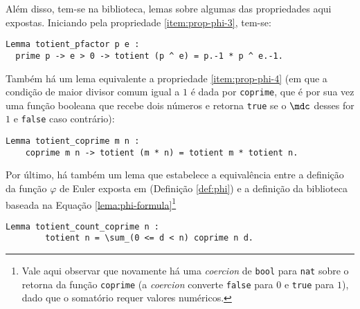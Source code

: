 Além disso, tem-se na biblioteca, lemas sobre algumas das propriedades aqui expostas. Iniciando pela propriedade \ref{item:prop-phi-3}, tem-se:
\begin{lstlisting}[language=coq,frame=single,tabsize=1]
Lemma totient_pfactor p e :
  prime p -> e > 0 -> totient (p ^ e) = p.-1 * p ^ e.-1.
\end{lstlisting}
Também há um lema equivalente a propriedade \ref{item:prop-phi-4} (em que a condição de maior divisor comum igual a $1$ é dada por \lstinline[language = coq]{coprime}, que é por sua vez uma função booleana que recebe dois números e retorna \lstinline[language = coq]{true} se o $\mdc$ desses for $1$ e \lstinline[language = coq]{false} caso contrário):
\begin{lstlisting}[language=coq,frame=single,tabsize=1]
Lemma totient_coprime m n :
    coprime m n -> totient (m * n) = totient m * totient n.
\end{lstlisting}
Por último, há também um lema que estabelece a equivalência entre a definição da função $\varphi$ de Euler exposta em \cite[p.~48]{book:2399854} (Definição \ref{def:phi}) e a definição da biblioteca baseada na Equação \ref{lema:phi-formula}\footnote{Vale aqui observar que novamente há uma \textit{coercion} de \lstinline[language = coq]{bool} para \lstinline[language = coq]{nat} sobre o retorna da função \lstinline[language = coq]{coprime} (a \textit{coercion} converte \lstinline[language = coq]{false} para $0$ e \lstinline[language = coq]{true} para $1$), dado que o somatório requer valores numéricos.}%
\begin{lstlisting}[language=coq,frame=single,tabsize=1]
    Lemma totient_count_coprime n : 
        totient n = \sum_(0 <= d < n) coprime n d.
\end{lstlisting} 

